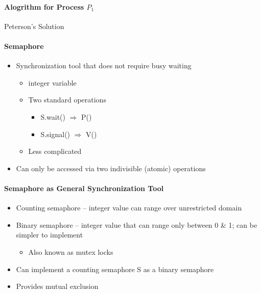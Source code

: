 \documentclass[titlepage]{article}
\begin{document}
  \paragraph{Alogrithm for Process {\color{blue} $P_1$}}

  \begin{center}
    \begin{algorithm}
      \SetAlgoLined
      \caption{Peterson's Solution}
    \end{algorithm}
  \end{center}

  \paragraph{Semaphore}

  \begin{itemize}
    \item Synchronization tool that does not require busy waiting
    \begin{itemize}
      \item integer variable
      \item Two standard operations
      \begin{itemize}
        \item {\color{blue} S.wait()} $\Rightarrow$ P()
        \item {\color{blue} S.signal()} $\Rightarrow$ V()
      \end{itemize}
      \item Less complicated
    \end{itemize}
    \item Can only be accessed via two indivisible (atomic) operations
  \end{itemize}

  \paragraph{Semaphore as General Synchronization Tool}

  \begin{itemize}
    \item {\color{red} Counting} semaphore -- integer value can range over unrestricted domain
    \item {\color{red} Binary} semaphore -- integer value that can range only between 0 \& 1; can be simpler to implement
    \begin{itemize}
      \item Also known as {\color{red} mutex locks}
    \end{itemize}
    \item Can implement a counting semaphore {\color{blue} S} as a binary semaphore
    \item Provides mutual exclusion
  \end{itemize}
\end{document}

